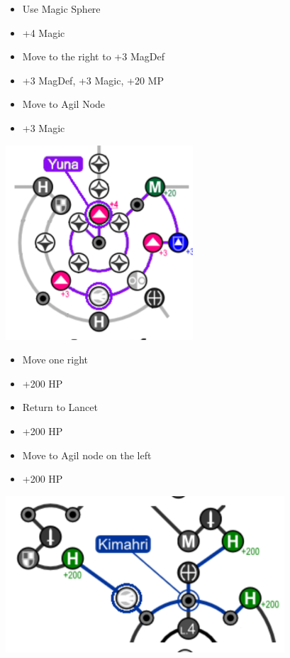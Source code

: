 \begin{multicols}{2}
\begin{spheregrid}
  \begin{itemize}
    \yunaf
    \begin{itemize}
      \item Use Magic Sphere
      \item +4 Magic
      \item Move to the right to +3 MagDef
      \item +3 MagDef, +3 Magic, +20 MP
      \item Move to Agil Node
      \item +3 Magic
    \end{itemize}
    \includegraphics{graphics/yunammr}
    \kimahrif
    \begin{itemize}
      \item Move one right
      \item +200 HP
      \item Return to Lancet
      \item +200 HP
      \item Move to Agil node on the left
      \item +200 HP
    \end{itemize}
    \includegraphics{graphics/kimahrimmr}

\end{itemize}
\end{spheregrid}
\end{multicols}
